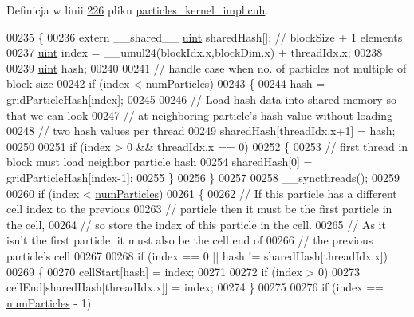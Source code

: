 Definicja w linii \hyperlink{particles__kernel__impl_8cuh_source_l00226}{226} pliku \hyperlink{particles__kernel__impl_8cuh_source}{particles\-\_\-kernel\-\_\-impl.\-cuh}.


\begin{DoxyCode}
00235 \{
00236     \textcolor{keyword}{extern} \_\_shared\_\_ \hyperlink{particles__kernel_8cuh_a91ad9478d81a7aaf2593e8d9c3d06a14}{uint} sharedHash[];    \textcolor{comment}{// blockSize + 1 elements}
00237     \hyperlink{particles__kernel_8cuh_a91ad9478d81a7aaf2593e8d9c3d06a14}{uint} index = \_\_umul24(blockIdx.x,blockDim.x) + threadIdx.x;
00238 
00239     \hyperlink{particles__kernel_8cuh_a91ad9478d81a7aaf2593e8d9c3d06a14}{uint} hash;
00240 
00241     \textcolor{comment}{// handle case when no. of particles not multiple of block size}
00242     \textcolor{keywordflow}{if} (index < \hyperlink{particles_8cpp_a05b8a90212054a3eb1a036ae0c269596}{numParticles})
00243     \{
00244         hash = gridParticleHash[index];
00245 
00246         \textcolor{comment}{// Load hash data into shared memory so that we can look}
00247         \textcolor{comment}{// at neighboring particle's hash value without loading}
00248         \textcolor{comment}{// two hash values per thread}
00249         sharedHash[threadIdx.x+1] = hash;
00250 
00251         \textcolor{keywordflow}{if} (index > 0 && threadIdx.x == 0)
00252         \{
00253             \textcolor{comment}{// first thread in block must load neighbor particle hash}
00254             sharedHash[0] = gridParticleHash[index-1];
00255         \}
00256     \}
00257 
00258     \_\_syncthreads();
00259 
00260     \textcolor{keywordflow}{if} (index < \hyperlink{particles_8cpp_a05b8a90212054a3eb1a036ae0c269596}{numParticles})
00261     \{
00262         \textcolor{comment}{// If this particle has a different cell index to the previous}
00263         \textcolor{comment}{// particle then it must be the first particle in the cell,}
00264         \textcolor{comment}{// so store the index of this particle in the cell.}
00265         \textcolor{comment}{// As it isn't the first particle, it must also be the cell end of}
00266         \textcolor{comment}{// the previous particle's cell}
00267 
00268         \textcolor{keywordflow}{if} (index == 0 || hash != sharedHash[threadIdx.x])
00269         \{
00270             cellStart[hash] = index;
00271 
00272             \textcolor{keywordflow}{if} (index > 0)
00273                 cellEnd[sharedHash[threadIdx.x]] = index;
00274         \}
00275 
00276         \textcolor{keywordflow}{if} (index == \hyperlink{particles_8cpp_a05b8a90212054a3eb1a036ae0c269596}{numParticles} - 1)

\end{DoxyCode}
